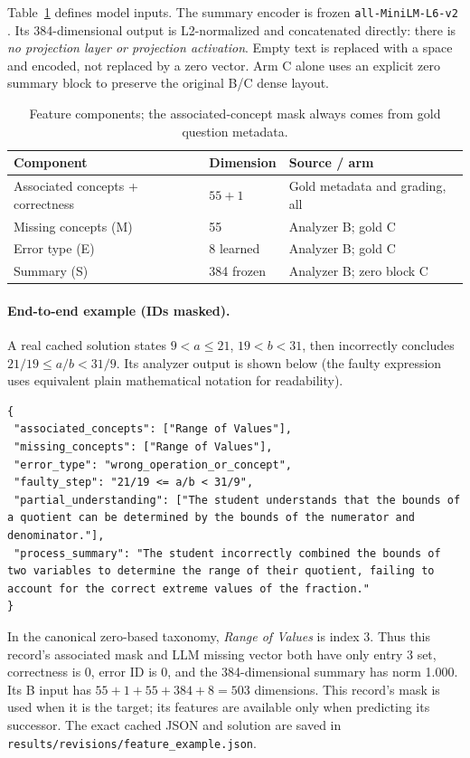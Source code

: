 \documentclass[11pt]{article}
\newcommand{\code}[1]{\texttt{\small #1}}
\begin{document}
Table~\ref{tab:features} defines model inputs. The summary encoder is frozen \code{all-MiniLM-L6-v2} \cite{reimers2019sbert}. Its 384-dimensional output is L2-normalized and concatenated directly: there is \emph{no projection layer or projection activation}. Empty text is replaced with a space and encoded, not replaced by a zero vector. Arm C alone uses an explicit zero summary block to preserve the original B/C dense layout.
\begin{table}[htbp]\centering\small
\caption{Feature components; the associated-concept mask always comes from gold question metadata.}\label{tab:features}
\begin{tabular}{@{}lll@{}}\toprule
Component & Dimension & Source / arm\\\midrule
Associated concepts + correctness & $55+1$ & Gold metadata and grading, all\\
Missing concepts (M) & 55 & Analyzer B; gold C\\
Error type (E) & 8 learned & Analyzer B; gold C\\
Summary (S) & 384 frozen & Analyzer B; zero block C\\\bottomrule
\end{tabular}\end{table}

\paragraph{End-to-end example (IDs masked).}
A real cached solution states $9<a\leq21$, $19<b<31$, then incorrectly concludes $21/19\leq a/b<31/9$. Its analyzer output is shown below (the faulty expression uses equivalent plain mathematical notation for readability).
\begin{lstlisting}
{
 "associated_concepts": ["Range of Values"],
 "missing_concepts": ["Range of Values"],
 "error_type": "wrong_operation_or_concept",
 "faulty_step": "21/19 <= a/b < 31/9",
 "partial_understanding": ["The student understands that the bounds of a quotient can be determined by the bounds of the numerator and denominator."],
 "process_summary": "The student incorrectly combined the bounds of two variables to determine the range of their quotient, failing to account for the correct extreme values of the fraction."
}
\end{lstlisting}
In the canonical zero-based taxonomy, \emph{Range of Values} is index 3. Thus this record's associated mask and LLM missing vector both have only entry 3 set, correctness is 0, error ID is 0, and the 384-dimensional summary has norm 1.000. Its B input has $55+1+55+384+8=503$ dimensions. This record's mask is used when it is the target; its features are available only when predicting its successor. The exact cached JSON and solution are saved in \code{results/revisions/feature\_example.json}.
\end{document}
